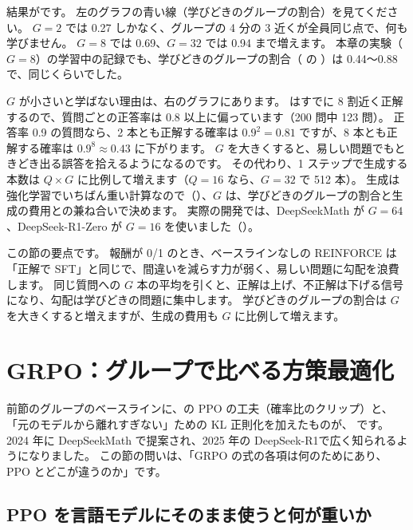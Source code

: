 結果がです。
左のグラフの青い線（学びどきのグループの割合）を見てください。
$G=2$ では 0.27 しかなく、グループの 4 分の 3 近くが全員同じ点で、何も学びません。
$G=8$ では 0.69、$G=32$ では 0.94 まで増えます。
本章の実験（$G=8$）の学習中の記録でも、学びどきのグループの割合（ の ）は 0.44〜0.88 で、同じくらいでした。

$G$ が小さいと学ばない理由は、右のグラフにあります。
 はすでに 8 割近く正解するので、質問ごとの正答率は 0.8 以上に偏っています（200 問中 123 問）。
正答率 0.9 の質問なら、2 本とも正解する確率は $0.9^2=0.81$ ですが、8 本とも正解する確率は $0.9^8\approx0.43$ に下がります。
$G$ を大きくすると、易しい問題でもときどき出る誤答を拾えるようになるのです。
その代わり、1 ステップで生成する本数は $Q\times G$ に比例して増えます（$Q=16$ なら、$G=32$ で 512 本）。
生成は強化学習でいちばん重い計算なので（）、$G$ は、学びどきのグループの割合と生成の費用との兼ね合いで決めます。
実際の開発では、DeepSeekMath が $G=64$、DeepSeek-R1-Zero が $G=16$ を使いました（）。

この節の要点です。
報酬が 0/1 のとき、ベースラインなしの REINFORCE は「正解で SFT」と同じで、間違いを減らす力が弱く、易しい問題に勾配を浪費します。
同じ質問への $G$ 本の平均を引くと、正解は上げ、不正解は下げる信号になり、勾配は学びどきの問題に集中します。
学びどきのグループの割合は $G$ を大きくすると増えますが、生成の費用も $G$ に比例して増えます。

\section{GRPO：グループで比べる方策最適化}\label{sec:rl-grpo}

前節のグループのベースラインに、の PPO の工夫（確率比のクリップ）と、
「元のモデルから離れすぎない」ための KL 正則化を加えたものが、
です\cite{shao2024deepseekmath}。
2024 年に DeepSeekMath で提案され、2025 年の DeepSeek-R1\cite{guo2025deepseekr1}で広く知られるようになりました。
この節の問いは、「GRPO の式の各項は何のためにあり、PPO とどこが違うのか」です。

\subsection{PPO を言語モデルにそのまま使うと何が重いか}

